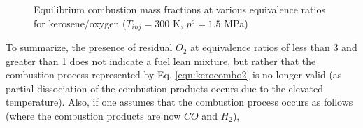 \begin{figure}[hp]
\begin{center}

\caption{Equilibrium combustion mass fractions at various equivalence ratios for kerosene/oxygen 
($T_{inj} = 300$ K, $p^o = 1.5$ MPa)}
\label{fig:kero_oxy_multiphi}
\end{center}
\end{figure}   

	To summarize, the presence of residual $O_2$ at equivalence ratios of less than 3 and greater than
1 does not indicate a fuel lean mixture, but rather that the combustion process represented by 
Eq. \ref{eqn:kerocombo2} is no longer valid (as partial dissociation of the combustion products occurs
due to the elevated temperature).  Also, if one assumes that the combustion process occurs as
follows (where the combustion products are now $CO$ and $H_2$),

